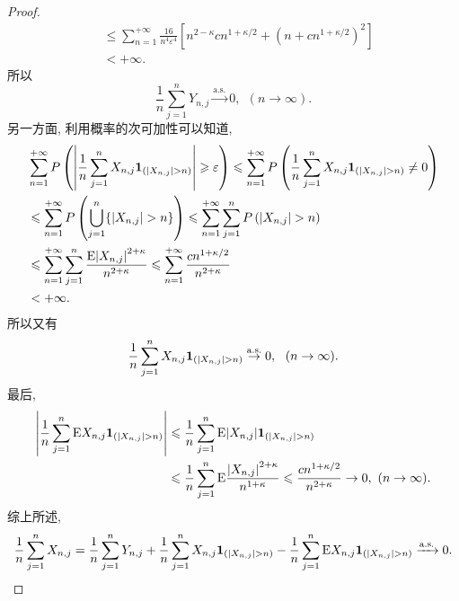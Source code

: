 \documentclass[12pt]{article}
\begin{document}
\begin{proof}
\begin{align*}
	        &\leqslant \sum_{n = 1}^{+\infty}\frac{16 }{n^4\varepsilon^4}\left[n^{2-\kappa}cn^{1+\kappa/2}+(n+cn^{1+\kappa/2})^2  \right]\\
	        &<+\infty.
	    \end{align*}
	    所以$$
	    \frac{1}{n}\sum_{j = 1}^nY_{n,j}\stackrel{\text{a.s.}}{\to} 0,~~(n\to\infty).
	    $$
	    另一方面, 利用概率的次可加性可以知道, \begin{align*}
	        &\sum_{n = 1}^{+\infty} P\left( \abs{\frac{1}{n}\sum_{j = 1}^nX_{n,j}\bm{1}_{(\abs{X_{n,j}}>n)}  }\geqslant\varepsilon \right) \leqslant \sum_{n = 1}^{+\infty} P\left( \frac{1}{n}\sum_{j = 1}^nX_{n,j}\bm{1}_{(\abs{X_{n,j}}>n)}  \neq 0 \right)\\
	        &\leqslant\sum_{n = 1}^{+\infty} P\left( \bigcup_{j=1}^n\{\abs{X_{n,j}}>n \} \right) \leqslant \sum_{n = 1}^{+\infty}\sum_{j = 1}^{n} P\left( \abs{X_{n,j}}>n \right)\\
	        &\leqslant \sum_{n = 1}^{+\infty}\sum_{j = 1}^{n} \frac{\mathrm{E}\abs{X_{n,j}}^{2+\kappa}}{n^{2+\kappa}} \leqslant \sum_{n = 1}^{+\infty} \frac{cn^{1+\kappa/2}}{n^{2+\kappa}}\\
	        &< +\infty.
	    \end{align*}
	    所以又有\begin{equation*}
	        \frac{1}{n}\sum_{j = 1}^nX_{n,j}\bm{1}_{(\abs{X_{n,j}}>n)}\stackrel{\text{a.s.}}{\to} 0,~~(n\to\infty).
	    \end{equation*}
	    最后, \begin{align*}
	        \abs{\frac{1}{n}\sum_{j = 1}^{n} \mathrm{E}X_{n,j}\bm{1}_{(\abs{X_{n,j}}>n)} } &\leqslant \frac{1}{n}\sum_{j = 1}^{n}\mathrm{E}\abs{X_{n,j}}\bm{1}_{(\abs{X_{n,j}}>n)}\\
	        &\leqslant \frac{1}{n}\sum_{j = 1}^{n}\mathrm{E}\frac{\abs{X_{n,j}}^{2+\kappa} }{n^{1+\kappa}}\leqslant \frac{cn^{1+\kappa/2}}{n^{2+\kappa}}\to 0,~(n\to\infty).
	    \end{align*}
	    综上所述, \begin{equation*}
	        \frac{1}{n}\sum_{j=1}^nX_{n,j} = \frac{1}{n}\sum_{j=1}^nY_{n,j} + \frac{1}{n}\sum_{j = 1}^nX_{n,j}\bm{1}_{(\abs{X_{n,j}}>n)} - \frac{1}{n}\sum_{j = 1}^{n} \mathrm{E}X_{n,j}\bm{1}_{(\abs{X_{n,j}}>n)} \xrightarrow{\text{a.s.}} 0.
	    \end{equation*}
	\end{proof}
	
\end{document}

